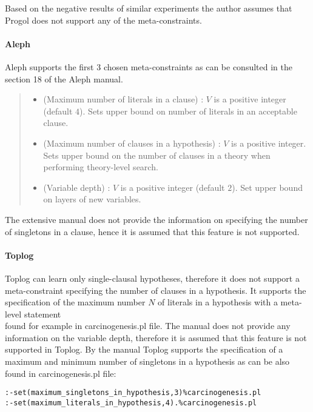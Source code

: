 Based on the negative results of similar experiments the author assumes that Progol does not support any of the meta-constraints.

\paragraph{Aleph}
Aleph supports the first 3 chosen meta-constraints as can be consulted in the section 18 of the Aleph manual\cite{aleph2007}.
\begin{quote}
\begin{itemize}
\item (Maximum number of literals in a clause) :
$V$ is a positive integer (default $4$). Sets upper bound on number of literals in an acceptable clause.
\item (Maximum number of clauses in a hypothesis) :
$V$ is a positive integer. Sets upper bound on the number of clauses in a theory  when performing theory-level search.
\item (Variable depth) : $V$ is a positive integer (default $2$). Set upper bound on layers of new variables.
\end{itemize}
\end{quote}

The extensive manual does not provide the information on specifying the number of singletons in a clause, hence it is assumed that this feature is not supported.

\paragraph{Toplog}
Toplog can learn only single-clausal hypotheses\cite{muggleton2012mc}, therefore it does not support a meta-constraint specifying the number of clauses in a hypothesis. It supports the specification of the maximum number $N$ of literals in a hypothesis with a meta-level statement\\
 found for example in carcinogenesis.pl file\cite{santos2008toplogWebsite}. The manual does not provide any information on the variable depth, therefore it is assumed that this feature is not supported in Toplog.
By the manual Toplog supports the specification of a maximum and minimum number of singletons in a hypothesis as can be also found in carcinogenesis.pl file:
\begin{lstlisting}
:-set(maximum_singletons_in_hypothesis,3)%carcinogenesis.pl
:-set(maximum_literals_in_hypothesis,4).%carcinogenesis.pl
\end{lstlisting}

